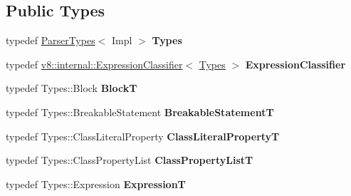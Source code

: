 \subsection*{Public Types}
\begin{DoxyCompactItemize}
\item 
\mbox{\label{classv8_1_1internal_1_1ParserBase_aa2970aa4d0aafe627ab67262c4792154}} 
typedef \mbox{\hyperlink{structv8_1_1internal_1_1ParserTypes}{Parser\+Types}}$<$ Impl $>$ {\bfseries Types}
\item 
\mbox{\label{classv8_1_1internal_1_1ParserBase_ae9b70f6e3e4a9141b0f3925faa02aabb}} 
typedef \mbox{\hyperlink{classv8_1_1internal_1_1ExpressionClassifier}{v8\+::internal\+::\+Expression\+Classifier}}$<$ \mbox{\hyperlink{structv8_1_1internal_1_1ParserTypes}{Types}} $>$ {\bfseries Expression\+Classifier}
\item 
\mbox{\label{classv8_1_1internal_1_1ParserBase_a86f7fdceb501fe4405a25a1abcc1c169}} 
typedef Types\+::\+Block {\bfseries BlockT}
\item 
\mbox{\label{classv8_1_1internal_1_1ParserBase_a955a56038f73f89d87db93a86aa357ee}} 
typedef Types\+::\+Breakable\+Statement {\bfseries Breakable\+StatementT}
\item 
\mbox{\label{classv8_1_1internal_1_1ParserBase_a8df185e59bb769279e71c7e39816d9b9}} 
typedef Types\+::\+Class\+Literal\+Property {\bfseries Class\+Literal\+PropertyT}
\item 
\mbox{\label{classv8_1_1internal_1_1ParserBase_a33edb3b89b40d74c3413e6a124c2b522}} 
typedef Types\+::\+Class\+Property\+List {\bfseries Class\+Property\+ListT}
\item 
\mbox{\label{classv8_1_1internal_1_1ParserBase_a880cc6b785ed45ae2e75de7adbe1c424}} 
typedef Types\+::\+Expression {\bfseries ExpressionT}
\item 
\mbox{\label{classv8_1_1internal_1_1ParserBase_acdd4564e16da53109f33b899a9c93e15}} 

\end{DoxyCompactItemize}
